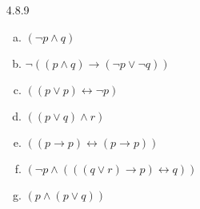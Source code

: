 \begin{enumerate}
\begin{proof}
\begin{enumerate}[(i)]
		\item \begin{enumerate}[(a)]
		
			\item Assume the induction hypothesis, that numbers of $($ and $)$ in $\phi$ are the same. Consider $\neg\phi$. Note that the number of $($'s $\neg\phi$ is the same as in $\phi$ and the number of $)$'s in $\neg\phi$ is the same as in $\phi$ (no new parentheses have been added). Hence, the numbers of $($ and $)$ in $\neg\phi$ are also the same.
			
			\item Assume the induction hypotheses, that numbers of $($ and $)$ in $\phi$ are the same and the numbers of $($ and $)$ in $\psi$ are the same. Denote the number of $($'s in $\phi$ by $n$, the number of $)$'s in $\phi$ by $m$, the number of $($'s in $\psi$ by $k$, and the number of $)$'s in $\psi$ by $l$. We have $n=k$ and $m=l$. Consider $(\phi\circ\psi)$. The number of $($'s in $(\phi\circ\psi)$ is $n+k+1$. The number of $)$'s in $(\phi\circ\psi)$ is $m+l+1$. Since  $n=k$ and $m=l$,  $n+k+1=m+l+1$, as desired.
	
		\end{enumerate}
		We conclude our claim by induction on formulas.
	
	\end{enumerate}
	
	\end{proof}
		
	\item[4.8.9]
	
		\begin{enumerate}[(a)]
		
		

\item $(\neg p\land q)$

\item $\neg((p\land q)\to (\neg p\lor\neg q))$

\item $((p\lor p)\leftrightarrow \neg p)$

\item $((p\lor q)\land r)$

\item $((p\to p)\leftrightarrow (p\to p))$

\item $(\neg p \land (((q\lor r)\to p)\leftrightarrow q))$



\item $(p\land (p\lor q))$




\end{enumerate}
\end{enumerate}
